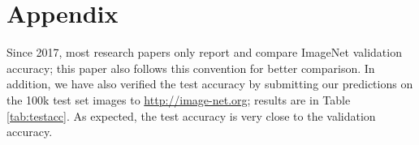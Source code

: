 \documentclass{article}
\begin{document}
\section*{Appendix}
Since 2017, most research papers only report and compare ImageNet validation accuracy; this paper also follows this convention for better comparison. In addition, we have also verified the test accuracy by submitting our predictions on the 100k test set images to {\small\url{http://image-net.org}}; results are in Table \ref{tab:testacc}. As expected, the test accuracy is very close to the validation accuracy.


\begin{table}[!h]
    \vskip -0.1in
    \caption{\textbf{ImageNet Validation vs. Test Top-1/5 Accuracy}. }
     \centering

     \label{tab:testacc}
     \vskip -0.1in
   \end{table}

 



\end{document}
